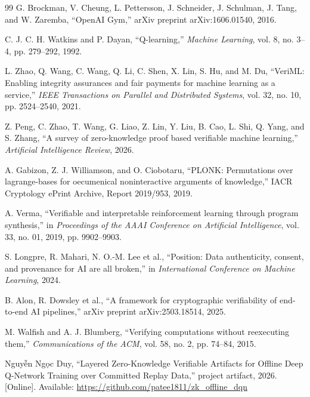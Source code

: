 \documentclass[12pt,a4paper,oneside]{report}
\begin{document}
\begin{thebibliography}{99}
G. Brockman, V. Cheung, L. Pettersson, J. Schneider, J. Schulman, J. Tang, and W. Zaremba,
``OpenAI Gym,''
arXiv preprint arXiv:1606.01540, 2016.

C. J. C. H. Watkins and P. Dayan,
``Q-learning,''
\textit{Machine Learning}, vol. 8, no. 3--4, pp. 279--292, 1992.

L. Zhao, Q. Wang, C. Wang, Q. Li, C. Shen, X. Lin, S. Hu, and M. Du,
``VeriML: Enabling integrity assurances and fair payments for machine learning as a service,''
\textit{IEEE Transactions on Parallel and Distributed Systems}, vol. 32, no. 10, pp. 2524--2540, 2021.

Z. Peng, C. Zhao, T. Wang, G. Liao, Z. Lin, Y. Liu, B. Cao, L. Shi, Q. Yang, and S. Zhang,
``A survey of zero-knowledge proof based verifiable machine learning,''
\textit{Artificial Intelligence Review}, 2026.

A. Gabizon, Z. J. Williamson, and O. Ciobotaru,
``PLONK: Permutations over lagrange-bases for oecumenical noninteractive arguments of knowledge,''
IACR Cryptology ePrint Archive, Report 2019/953, 2019.

A. Verma,
``Verifiable and interpretable reinforcement learning through program synthesis,''
in \textit{Proceedings of the AAAI Conference on Artificial Intelligence}, vol. 33, no. 01, 2019, pp. 9902--9903.

S. Longpre, R. Mahari, N. O.-M. Lee et al.,
``Position: Data authenticity, consent, and provenance for AI are all broken,''
in \textit{International Conference on Machine Learning}, 2024.

B. Alon, R. Dowsley et al.,
``A framework for cryptographic verifiability of end-to-end AI pipelines,''
arXiv preprint arXiv:2503.18514, 2025.

M. Walfish and A. J. Blumberg,
``Verifying computations without reexecuting them,''
\textit{Communications of the ACM}, vol. 58, no. 2, pp. 74--84, 2015.

Nguyễn Ngọc Duy,
``Layered Zero-Knowledge Verifiable Artifacts for Offline Deep Q-Network Training over Committed Replay Data,''
project artifact, 2026. [Online]. Available: \url{https://github.com/patee1811/zk_offline_dqn}

\end{thebibliography}

\clearpage
\appendix
\end{document}
